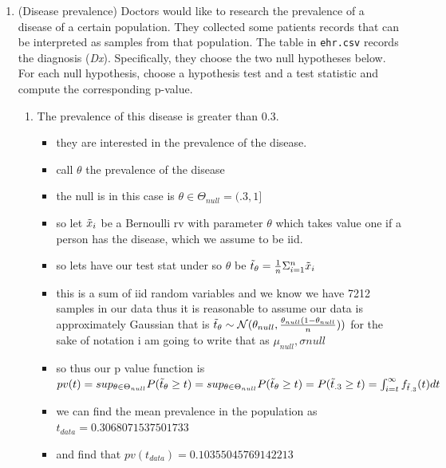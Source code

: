 \documentclass[12pt,twoside]{article}
\begin{document}
\begin{enumerate}
\item (Disease prevalence)
Doctors would like to research the prevalence of a disease of a certain population. They collected some patients records that can be interpreted as samples from that population. The table in \texttt{ehr.csv} records the diagnosis (\textit{Dx}). Specifically, they choose the two null hypotheses below. For each null hypothesis, choose a hypothesis test and a test statistic and compute the corresponding p-value. 
\begin{enumerate}
\item The prevalence of this disease is greater than 0.3.
\begin{itemize}
    \color{blue}
    \item they are interested in the prevalence of the disease.
    \item call $\theta$ the prevalence of the disease 
    \item the null is in this case is $\theta\in \Theta_{null}=(.3,1]$
    \item so let $\Tilde{x}_i$ be a Bernoulli rv with parameter $\theta$ which takes value one if a person has the disease, which we assume to be iid. 
    \item so lets have our test stat under so $\theta$ be $\Tilde{t}_{\theta}=\frac{1}{n}\Sigma_{i=1}^{n}\Tilde{x}_i$
    \item this is a sum of iid random variables and we know we have 7212 samples in our data thus it is reasonable to assume our data is approximately Gaussian that is $\Tilde{t}_{\theta}\sim \mathcal{N}(\theta_{null}, \frac{\theta_{null}(1-\theta_{null}}{n}))$ for the sake of notation i am going to write that as $\mu_{null}, \sigma{null}$
    \item so thus our p value function is $pv(t)=sup_{\theta\in \Theta_{null}}P(\Tilde{t}_{\theta}\geq t)=sup_{\theta\in \Theta_{null}}P(\Tilde{t}_{\theta}\geq t)=P(\Tilde{t}_{.3}\geq t)=\int_{i=t}^{\infty}f_{\Tilde{t}_{.3}}(t)dt$ 
    \item we can find the mean prevalence in the population as $t_{data}=0.3068071537501733$
    \item and find that $pv(t_{data})=0.10355045769142213$
\end{itemize}



\end{enumerate}
\end{enumerate}
\end{document}

